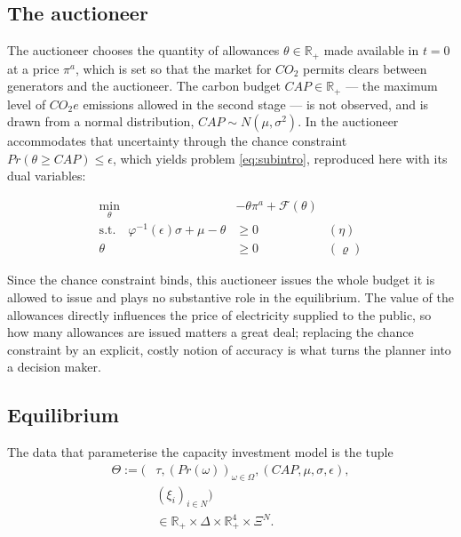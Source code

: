 \documentclass[a4paper,fleqn]{cas-dc}
\begin{document}
\subsection{The auctioneer}\label{subsec:auctioneer}

The auctioneer chooses the quantity of allowances $\theta\in\mathbb{R}_+$ made available in $t=0$ at a price $\pi^a$, which is set so that the market for $CO_2$ permits clears between generators and the auctioneer. The carbon budget $CAP\in\mathbb{R}_+$ --- the maximum level of $CO_2e$ emissions allowed in the second stage --- is not observed, and is drawn from a normal distribution, $CAP\sim N(\mu,\sigma^2)$. In \citet{amigo_two_2021} the auctioneer accommodates that uncertainty through the chance constraint $Pr(\theta\geq CAP)\leq\epsilon$, which yields problem \eqref{eq:subintro}, reproduced here with its dual variables:

\begin{align}
\min_{\theta} \; & -\theta\pi^a+\mathcal{F}(\theta) \label{eq:sub}\\
\text{s.t.}\quad \varphi^{-1}(\epsilon)\sigma+\mu-\theta &\geq 0 & (\eta) \label{res:sub1}\\
\theta &\geq 0 & (\varrho) \label{res:sub2}
\end{align}

Since the chance constraint binds, this auctioneer issues the whole budget it is allowed to issue and plays no substantive role in the equilibrium. The value of the allowances directly influences the price of electricity supplied to the public, so how many allowances are issued matters a great deal; replacing the chance constraint by an explicit, costly notion of accuracy is what turns the planner into a decision maker.

\subsection{Equilibrium}\label{subsec:equilibrium}

The data that parameterise the capacity investment model is the tuple
\begin{equation}\label{eq:data}
\begin{split}
\Theta := \Big(& \tau,(Pr(\omega))_{\omega\in\Omega},\left(CAP,\mu,\sigma,\epsilon\right), \\
& \left(\xi_i\right)_{i\in N}\Big) \\
& \in\mathbb{R}_+\times\Delta\times\mathbb{R}_+^4\times\Xi^N .
\end{split}
\end{equation}
\end{document}
